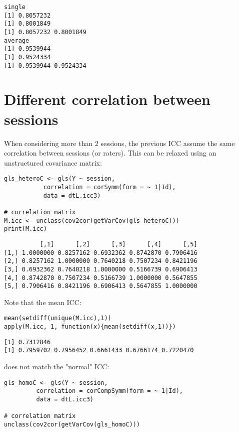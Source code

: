 \documentclass{article}
\begin{document}
\begin{verbatim}
single
[1] 0.8057232
[1] 0.8001849
[1] 0.8057232 0.8001849
average
[1] 0.9539944
[1] 0.9524334
[1] 0.9539944 0.9524334
\end{verbatim}

\clearpage

\section{Different correlation between sessions}
\label{sec:org0fd120e}

When considering more than 2 sessions, the previous ICC assume the
same correlation between sessions (or raters). This can be relaxed
using an unstructured covariance matrix:

\begin{lstlisting}
gls_heteroC <- gls(Y ~ session,
		   correlation = corSymm(form = ~ 1|Id),
		   data = dtL.icc3)

# correlation matrix
M.icc <- unclass(cov2cor(getVarCov(gls_heteroC)))
print(M.icc)
\end{lstlisting}

\begin{verbatim}
          [,1]      [,2]      [,3]      [,4]      [,5]
[1,] 1.0000000 0.8257162 0.6932362 0.8742870 0.7906416
[2,] 0.8257162 1.0000000 0.7640218 0.7507234 0.8421196
[3,] 0.6932362 0.7640218 1.0000000 0.5166739 0.6906413
[4,] 0.8742870 0.7507234 0.5166739 1.0000000 0.5647855
[5,] 0.7906416 0.8421196 0.6906413 0.5647855 1.0000000
\end{verbatim}

Note that the mean ICC:
\begin{lstlisting}
mean(setdiff(unique(M.icc),1))
apply(M.icc, 1, function(x){mean(setdiff(x,1))})
\end{lstlisting}

\begin{verbatim}
[1] 0.7312846
[1] 0.7959702 0.7956452 0.6661433 0.6766174 0.7220470
\end{verbatim}

does not match the "normal" ICC:
\begin{lstlisting}
gls_homoC <- gls(Y ~ session,
		 correlation = corCompSymm(form = ~ 1|Id),
		 data = dtL.icc3)

# correlation matrix
unclass(cov2cor(getVarCov(gls_homoC)))
\end{lstlisting}
\end{document}
